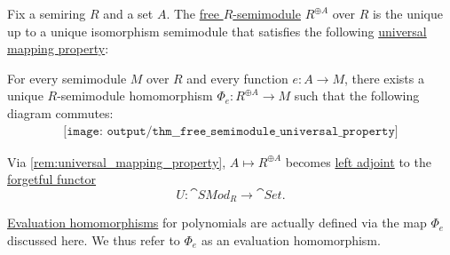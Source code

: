 \begin{theorem}\label{thm:free_semimodule_universal_property}
  Fix a semiring \( R \) and a set \( A \). The \hyperref[def:free_semimodule]{free \( R \)-semimodule} \( R^{\oplus A} \) over \( R \) is the unique up to a unique isomorphism semimodule that satisfies the following \hyperref[rem:universal_mapping_property]{universal mapping property}:
  \begin{displayquote}
    For every semimodule \( M \) over \( R \) and every function \( e: A \to M \), there exists a unique \( R \)-semimodule homomorphism \( \Phi_e: R^{\oplus A} \to M \) such that the following diagram commutes:
    \begin{equation}\label{eq:thm:free_semimodule_universal_property/diagram}
      \begin{aligned}
        \texttt{[image: output/thm\_\_free\_semimodule\_universal\_property]}
      \end{aligned}
    \end{equation}
  \end{displayquote}
\end{theorem}
\begin{comments}
  \item Via \cref{rem:universal_mapping_property}, \( A \mapsto R^{\oplus A} \) becomes \hyperref[def:category_adjunction]{left adjoint} to the \hyperref[def:concrete_category]{forgetful functor}
  \begin{equation*}
    U: \cat{SMod}_R \to \cat{Set}.
  \end{equation*}

  \item \hyperref[con:evaluation_homomorphism]{Evaluation homomorphisms} for polynomials are actually defined via the map \( \Phi_e \) discussed here. We thus refer to \( \Phi_e \) as an evaluation homomorphism.
\end{comments}
